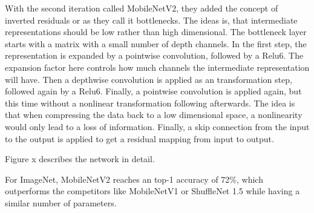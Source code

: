 With the second iteration called MobileNetV2, they added the concept of inverted
residuals or as they call it bottlenecks. The ideas is, that intermediate
representations should be low rather than high dimensional. The bottleneck layer
starts with a matrix with a small number of depth channels. In the first step,
the representation is expanded by a pointwise convolution, followed by a Relu6.
The expansion factor here controls how much channels the intermediate
representation will have. Then a depthwise convolution is applied as an
transformation step, followed again by a Relu6. Finally, a pointwise convolution
is applied again, but this time without a nonlinear transformation following
afterwards. The idea is that when compressing the data back to a low dimensional
space, a nonlinearity would only lead to a loss of information. Finally, a skip
connection from the input to the output is applied to get a residual mapping
from input to output.

Figure x describes the network in detail.

For ImageNet, MobileNetV2 reaches an top-1 accuracy of 72\%, which outperforms
the competitors like MobileNetV1 or ShuffleNet 1.5 while having a similar number
of parameters.


